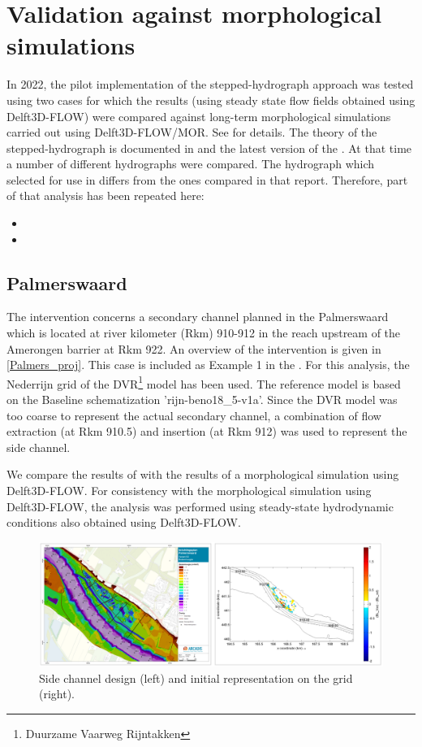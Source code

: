 \chapter{Validation against morphological simulations} \label{Chp:Morphology}

In 2022, the pilot implementation of the stepped-hydrograph approach was tested using two cases for which the \dfastmi results (using steady state flow fields obtained using Delft3D-FLOW) were compared against long-term morphological simulations carried out using Delft3D-FLOW/MOR.
See \citet{GiriJagers2022} for details.
The theory of the stepped-hydrograph is documented in \citet{JagersGiri2022} and the latest version of the \citet{um}.
At that time a number of different hydrographs were compared.
The hydrograph which selected for use in  differs from the ones compared in that report.
Therefore, part of that analysis has been repeated here:

\begin{itemize}
\item {}
\item {}
\end{itemize}

\section{Palmerswaard} \label{Sec:Palmerswaard}

The intervention concerns a secondary channel planned in the Palmerswaard which is located at river kilometer (Rkm) 910-912 in the reach upstream of the Amerongen barrier at Rkm 922.
An overview of the intervention is given in \autoref{Palmers_proj}.
This case is included as Example 1 in the \citet{um}.
For this analysis, the Nederrijn grid of the DVR\footnote{Duurzame Vaarweg Rijntakken} model has been used.
The reference model is based on the Baseline schematization 'rijn-beno18\_5-v1a'.
Since the DVR model was too coarse to represent the actual secondary channel, a combination of flow extraction (at Rkm 910.5) and insertion (at Rkm 912) was used to represent the side channel.

We compare the results of \dfmi with the results of a morphological simulation using Delft3D-FLOW.
For consistency with the morphological simulation using Delft3D-FLOW, the \dfmi analysis was performed using steady-state hydrodynamic conditions also obtained using Delft3D-FLOW.

\begin{figure}
\includegraphics[width=\columnwidth]{figures/Palmerswaard_proj.png}
\caption{Side channel design (left) and initial representation on the grid (right).}
\label{Palmers_proj}
\end{figure}

